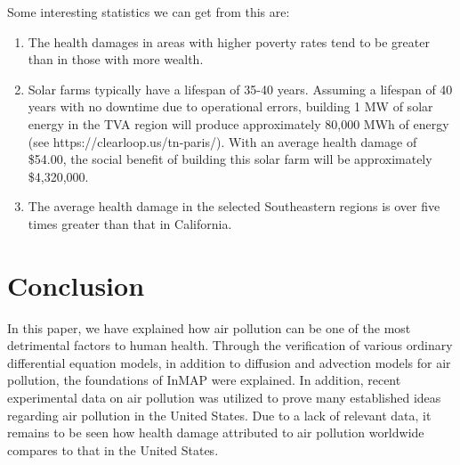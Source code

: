 \documentclass{article}
\begin{document}
Some interesting statistics we can get from this are:

\begin{enumerate}
    \item The health damages in areas with higher poverty rates tend to be greater than in those with more wealth.
    \item Solar farms typically have a lifespan of 35-40 years. Assuming a lifespan of 40 years with no downtime due to operational errors,
    building 1 MW of solar energy in the TVA region will produce approximately 80,000 MWh of energy (see https://clearloop.us/tn-paris/). With an average health damage of \$54.00,
    the social benefit of building this solar farm will be approximately \$4,320,000.
    \item The average health damage in the selected Southeastern regions is over five times greater than that in California.
  \end{enumerate} 

\section{Conclusion}

In this paper, we have explained how air pollution can be one of the most detrimental factors to human health. Through the verification
of various ordinary differential equation models, in addition to diffusion and advection models for air pollution, the foundations of InMAP
were explained. In addition, recent experimental data on air pollution was utilized to prove many established ideas regarding air pollution in the United States.
Due to a lack of relevant data, it remains to be seen how health damage attributed to air pollution worldwide compares to that in the United States.
\end{document}
